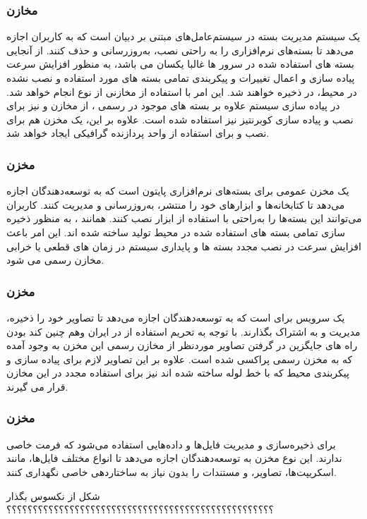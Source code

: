 \subsubsection{مخازن }
یک سیستم مدیریت بسته در سیستم‌عامل‌های مبتنی بر دبیان است که به کاربران اجازه می‌دهد تا بسته‌های نرم‌افزاری را به راحتی نصب، به‌روزرسانی و حذف کنند. از آنجایی بسته های استفاده شده در سرور ها غالبا یکسان می باشد، به منظور افزایش سرعت پیاده سازی و اعمال تغییرات و پیکربندی تمامی بسته های مورد استفاده و نصب نشده در محیط، در  ذخیره خواهند شد. این امر با استفاده از مخازنی از نوع  انجام خواهد شد. در پیاده سازی سیستم علاوه بر بسته های موجود در  رسمی ، از مخازن  و  نیز برای نصب و پیاده سازی کوبرنتیز نیز استفاده شده است. علاوه بر این، یک مخزن هم برای نصب  و  برای استفاده از واحد پردازنده گرافیکی ایجاد خواهد شد.
\subsubsection{مخزن }
	یک مخزن عمومی برای بسته‌های نرم‌افزاری پایتون است که به توسعه‌دهندگان اجازه می‌دهد تا کتابخانه‌ها و ابزارهای خود را منتشر، به‌روزرسانی و مدیریت کنند. کاربران می‌توانند این بسته‌ها را به‌راحتی با استفاده از ابزار  نصب کنند. همانند ، به منظور ذخیره سازی تمامی بسته های استفاده شده در محیط تولید ساخته شده اند. این امر باعث افزایش سرعت در نصب مجدد بسته ها و پایداری سیستم در زمان های قطعی یا خرابی مخازن رسمی می شود.
\subsubsection{مخزن }
	یک سرویس برای  است که به توسعه‌دهندگان اجازه می‌دهد تا تصاویر خود را ذخیره، مدیریت و به اشتراک بگذارند. با توجه به تحریم استفاده از  در ایران وهم چنین کند بودن راه های جایگزین در گرفتن تصاویر موردنظر از مخازن رسمی این مخزن به وجود آمده که به مخزن رسمی  پراکسی شده است. علاوه بر این تصاویر لازم برای پیاده سازی و پیکربندی محیط که با خط لوله  ساخته شده اند نیز برای استفاده مجدد در این مخازن قرار می گیرند.
\subsubsection{مخزن }
	برای ذخیره‌سازی و مدیریت فایل‌ها و داده‌هایی استفاده می‌شود که فرمت خاصی ندارند. این نوع مخزن به توسعه‌دهندگان اجازه می‌دهد تا انواع مختلف فایل‌ها، مانند اسکریپت‌ها، تصاویر، و مستندات را بدون نیاز به ساختاردهی خاصی نگهداری کنند.


شکل از نکسوس بگذار ؟؟؟؟؟؟؟؟؟؟؟؟؟؟؟؟؟؟؟؟؟؟؟؟؟؟؟؟؟؟؟؟؟؟؟؟؟؟؟؟؟؟؟؟؟؟؟؟؟؟؟











